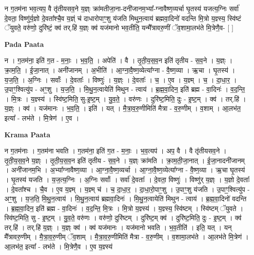 \documentclass[17pt]{extarticle}
\begin{document}
न ग॒तम॑ना भव॒त्यप॒ वै तृ॑तीयसव॒ने य॒ज्ञ्ः क्रा॑मतीजा॒ना-दनी॑जानम॒भ्या᳚-ग्नावैष्ण॒व्यर्चा घृ॒तस्य॑ यजत्य॒ग्निः सर्वा॑ दे॒वता॒ विष्णु॑र्य॒ज्ञो दे॒वता᳚श्चै॒व य॒ज्ञ्ं च॑ दाधारोपाꣳ॒॒शु य॑जति मिथुन॒त्वाय॑ ब्रह्मवा॒दिनो॑ वदन्ति मि॒त्रो य॒ज्ञ्स्य॒ स्वि॑ष्टं ॅयुवते॒ वरु॑णो॒ दुरि॑ष्टं॒ क्व॑ तर्.हि॑ य॒ज्ञ्ः क्व॑ यज॑मानो भव॒तीति॒ यन्मै᳚त्रावरु॒णीं ॅव॒शामा॒लभ॑ते मि॒त्रेणै॒व- [  ] \newline

\textbf{Pada Paata} \newline

न । ग॒तम॑ना॒ इति॑ ग॒त - म॒नाः॒ । भ॒व॒ति॒ । अपेति॑ । वै । तृ॒ती॒य॒स॒व॒न इति॑ तृतीय - स॒व॒ने । य॒ज्ञ्ः । क्रा॒म॒ति॒ । ई॒जा॒नात् । अनी॑जानम् । अ॒भीति॑ । आ॒ग्ना॒वै॒ष्ण॒व्येत्या᳚ग्ना - वै॒ष्ण॒व्या । ऋ॒चा । घृ॒तस्य॑ । य॒ज॒ति॒ । अ॒ग्निः । सर्वाः᳚ । दे॒वताः᳚ । विष्णुः॑ । य॒ज्ञ्ः । दे॒वताः᳚ । च॒ । ए॒व । य॒ज्ञ्म् । च॒ । दा॒धा॒र॒ । उ॒पाꣳ॒॒श्वित्यु॑प - अꣳ॒॒शु । य॒ज॒ति॒ । मि॒थु॒न॒त्वायेति॑ मिथुन - त्वाय॑ । ब्र॒ह्म॒वा॒दिन॒ इति॑ ब्रह्म - वा॒दिनः॑ । व॒द॒न्ति॒ । मि॒त्रः । य॒ज्ञ्स्य॑ । स्वि॑ष्ट॒मिति॒ सु-इ॒ष्ट॒म् । यु॒व॒ते॒ । वरु॑णः । दुरि॑ष्ट॒मिति॒ दुः - इ॒ष्ट॒म् । क्व॑ । तर्.हि॑ । य॒ज्ञ्ः । क्व॑ । यज॑मानः । भ॒व॒ति॒ । इति॑ । यत् । मै॒त्रा॒व॒रु॒णीमिति॑ मैत्रा - व॒रु॒णीम् । व॒शाम् । आ॒लभ॑त॒ इत्या᳚ - लभ॑ते । मि॒त्रेण॑ । ए॒व ।  \newline


\textbf{Krama Paata} \newline

न ग॒तम॑नाः । ग॒तम॑ना भवति । ग॒तम॑ना॒ इति॑ ग॒त - म॒नाः॒ । भ॒व॒त्यप॑ । अप॒ वै । वै तृ॑तीयसव॒ने । तृ॒ती॒य॒स॒व॒ने य॒ज्ञ्ः । तृ॒ती॒य॒स॒व॒न इति॑ तृतीय - स॒व॒ने । य॒ज्ञ्ः क्रा॑मति । क्रा॒म॒ती॒जा॒नात् । ई॒जा॒नादनी॑जानम् । अनी॑जानम॒भि । अ॒भ्या᳚ग्नावैष्ण॒व्या । आ॒ग्ना॒वै॒ष्ण॒व्यर्चा । आ॒ग्ना॒वै॒ष्ण॒व्येत्या᳚ग्ना - वै॒ष्ण॒व्या । ऋ॒चा घृ॒तस्य॑ । घृ॒तस्य॑ यजति । य॒ज॒त्य॒ग्निः । अ॒ग्निः सर्वाः᳚ । सर्वा॑ दे॒वताः᳚ । दे॒वता॒ विष्णुः॑ । विष्णु॑र् य॒ज्ञ्ः । य॒ज्ञो दे॒वताः᳚ । दे॒वता᳚श्च । चै॒व । ए॒व य॒ज्ञ्म् । य॒ज्ञ्म् च॑ । च॒ दा॒धा॒र॒ । दा॒धा॒रो॒पाꣳ॒॒शु । उ॒पाꣳ॒॒शु य॑जति । उ॒पाꣳ॒॒श्वित्यु॑प - अꣳ॒॒शु । य॒ज॒ति॒ मि॒थु॒न॒त्वाय॑ । मि॒थु॒न॒त्वाय॑ ब्रह्मवा॒दिनः॑ । मि॒थु॒न॒त्वायेति॑ मिथुन - त्वाय॑ । ब्र॒ह्म॒वा॒दिनो॑ वदन्ति । ब्र॒ह्म॒वा॒दिन॒ इति॑ ब्रह्म - वा॒दिनः॑ । व॒द॒न्ति॒ मि॒त्रः । मि॒त्रो य॒ज्ञ्स्य॑ । य॒ज्ञ्स्य॒ स्वि॑ष्टम् । स्वि॑ष्टम् ॅयुवते । स्वि॑ष्ट॒मिति॒ सु - इ॒ष्ट॒म् । यु॒व॒ते॒ वरु॑णः । वरु॑णो॒ दुरि॑ष्टम् । दुरि॑ष्ट॒म् क्व॑ । दुरि॑ष्ट॒मिति॒ दुः - इ॒ष्ट॒म् । क्व॑ तर्.हि॑ । तर्.हि॑ य॒ज्ञ्ः । य॒ज्ञ्ः क्व॑ । क्व॑ यज॑मानः । यज॑मानो भवति । भ॒व॒तीति॑ । इति॒ यत् । यन् मै᳚त्रावरु॒णीम् । मै॒त्रा॒व॒रु॒णीम् ॅव॒शाम् । मै॒त्रा॒व॒रु॒णीमिति॑ मैत्रा - व॒रु॒णीम् । व॒शामा॒लभ॑ते । आ॒लभ॑ते मि॒त्रेण॑ । आ॒लभ॑त॒ इत्या᳚ - लभ॑ते । मि॒त्रेणै॒व । ए॒व य॒ज्ञ्स्य॑ \newline
\end{document}
